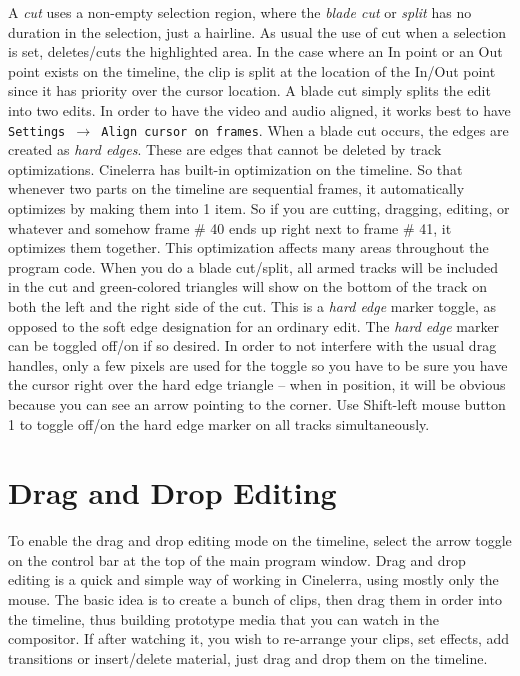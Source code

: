  A \textit{cut} uses a non-empty selection region, where the \textit{blade cut} or \textit{split} has no duration in the selection, just a hairline.  As usual the use of cut when a selection is set, deletes/cuts the highlighted area.  In the case where an In point or an Out point exists on the timeline, the clip is split at the location of the In/Out point since it has priority over the cursor location.  A blade cut simply splits the edit into two edits.  In order to have the video and audio aligned, it works best to have \texttt{Settings $\rightarrow$ Align cursor on frames}.  When a blade cut occurs, the edges are created as \textit{hard edges}.  These are edges that cannot be deleted by track optimizations.
Cinelerra has built-in optimization on the timeline.  So that whenever two parts on the timeline are sequential frames, it automatically optimizes by making them into 1 item.  So if you are cutting, dragging, editing, or whatever and somehow frame \# 40 ends up right next to frame \# 41, it optimizes them together.  This optimization affects many areas throughout the program code.
When you do a blade cut/split, all armed tracks will be included in the cut and green-colored triangles will show on the bottom of the track on both the left and the right side of the cut.  This is a \textit{hard edge} marker toggle, as opposed to the soft edge designation for an ordinary edit.  The \textit{hard edge} marker can be toggled off/on if so desired.  In order to not interfere with the usual drag handles, only a few pixels are used for the toggle so you have to be sure you have the cursor right over the hard edge triangle  -- when in position, it will be obvious because you can see an arrow pointing to the corner.  Use Shift-left mouse button 1 to toggle off/on the hard edge marker on all tracks simultaneously.

\section{Drag and Drop Editing}%
\label{sec:drag_drop_editing}

To enable the drag and drop editing mode on the timeline, select the arrow toggle on the control bar at the top of the main program window.  Drag and drop editing is a quick and simple way of working in Cinelerra, using mostly only the mouse. The basic idea is to create a bunch of clips, then drag them in order into the timeline, thus building prototype media that you can watch in the compositor. If after watching it, you wish to re-arrange your clips, set effects, add transitions or insert/delete material, just drag and drop them on the timeline. 

